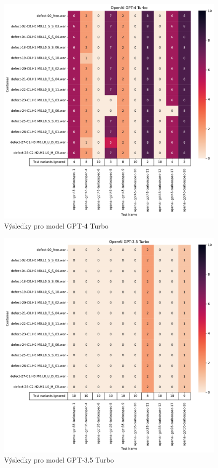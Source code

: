 \documentclass[czech, ma, kiv, he, iso690alph, pdf, viewonly]{fasthesis}
\begin{document}
            \begin{figure}
                \includegraphics[width=\textwidth]{pic/gpt-4-turbo-results.pdf}
                \caption{Výsledky pro model GPT-4 Turbo}
                \label{fig:res:gpt-4-turbo}
            \end{figure}

            \begin{figure}
                \includegraphics[width=\textwidth]{pic/gpt-3.5-turbo-results.pdf}
                \caption{Výsledky pro model GPT-3.5 Turbo}
                \label{fig:res:gpt-35-turbo}
            \end{figure}
\end{document}
